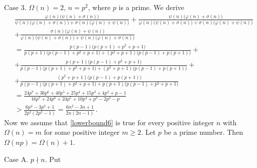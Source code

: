 \documentclass[12pt]{article}
\begin{document}
Case 3. \; $\Omega(n)=2$, $n=p^2$, where $p$ is a prime. We derive
\begin{align*}
&\frac{\varphi(n)\big(\psi(n)+\sigma(n)\big)}{\psi(n)\big(\varphi(n)+\sigma(n)\big)+\sigma(n)\big(\varphi(n)+\psi(n)\big)}
+\frac{\psi(n)\big(\varphi(n)+\sigma(n)\big)}{\varphi(n)\big(\psi(n)+\sigma(n)\big)+\sigma(n)\big(\varphi(n)+\psi(n)\big)}\\
&+\frac{\sigma(n)\big(\varphi(n)+\psi(n)\big)}{\varphi(n)\big(\psi(n)+\sigma(n)\big)+\psi(n)\big(\varphi(n)+\sigma(n)\big)}\\
&=\frac{p(p-1)\big(p(p+1)+p^2+p+1\big)}{p(p+1)\big(p(p-1)+p^2+p+1\big)+(p^2+p+1)\big(p(p-1)+p(p+1)\big)}+\\
&+\frac{p(p+1)\big(p(p-1)+p^2+p+1\big)}{p(p-1)\big(p(p+1)+p^2+p+1\big)+(p^2+p+1)\big(p(p-1)+p(p+1)\big)}+\\
&+\frac{(p^2+p+1)\big(p(p-1)+p(p+1)\big)}{p(p-1)\big(p(p+1)+p^2+p+1\big)+p(p+1)\big(p(p-1)+p^2+p+1\big)}\\
&=\frac{24p^7+36p^6+40p^5+25p^4+15p^3+4p^2+p-1}{16p^7+24p^6+24p^5+10p^4+p^3-2p^2-p}\\
&>\frac{6p^4-3p^2+1}{2p^2(2p^2-1)}=\frac{6n^2-3n+1}{2n(2n-1)}\,.
\end{align*}
Now we assume that \eqref{lowerbound6} is true for every positive integer $n$ with $\Omega(n)=m$ for some positive integer $m\geq2$.
Let $p$ be a prime number. Then $\Omega(np)=\Omega(n)+1$.

Case A.  \;  $p\nmid n$. Put
\end{document}
